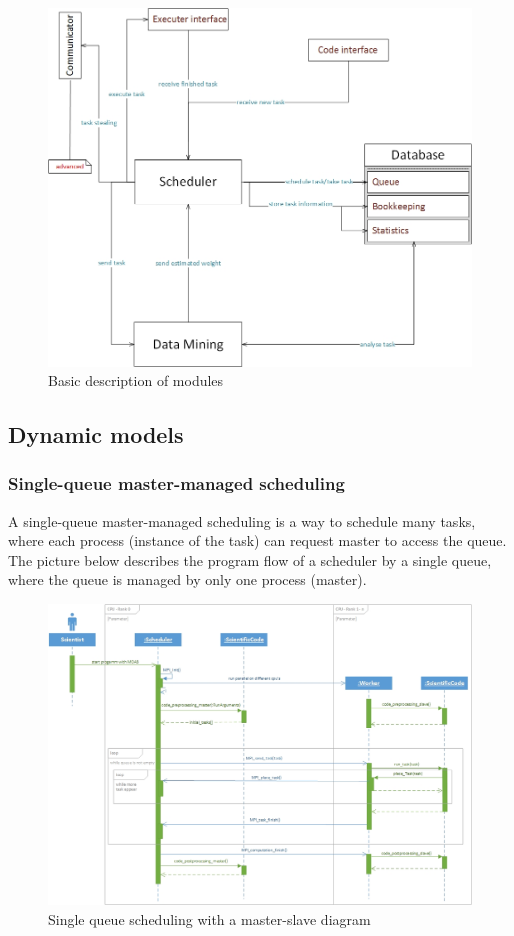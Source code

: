 \vspace{1cm}
	\begin{figure}[H]
\includegraphics[width=.9\textwidth,height=.9\textheight,keepaspectratio]	{images/modules.jpg}
	\caption{Basic description of modules}
	\end{figure}
\newpage

\subsection{Dynamic models}
\vspace{0.5cm}
\subsubsection{Single-queue master-managed scheduling}
\vspace{0.5cm}
A single-queue master-managed scheduling is a way to schedule many tasks, where each process (instance of the task) can request master to access the queue. The picture below describes the program flow of a scheduler by a single queue, where the queue is managed by only one process (master). 
\vspace{1cm}
	\begin{figure}[H]
	\centering
	\includegraphics[width=15cm]{images/Master-slave.jpg}
	\caption{Single queue scheduling with a master-slave diagram} 
	\end{figure}
\newpage
